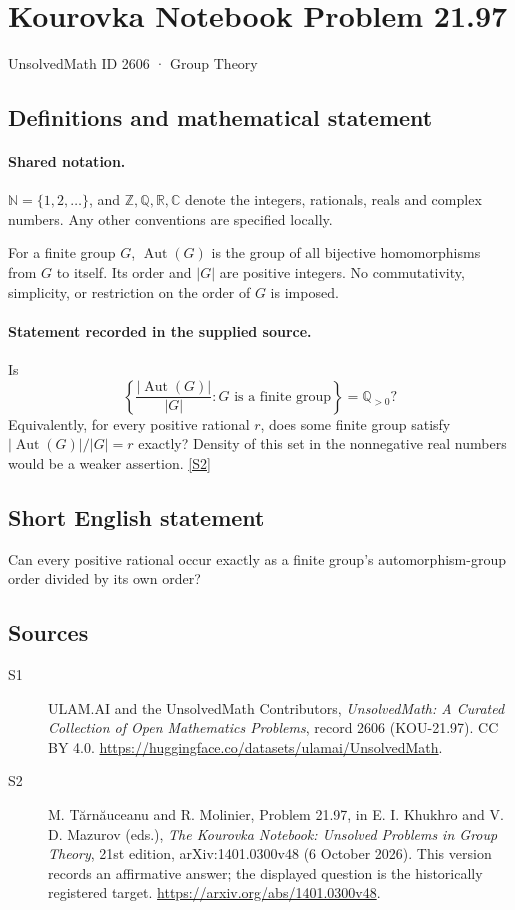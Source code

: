 \documentclass[11pt]{article}
\newcommand{\sref}[2]{\hyperlink{source:#1:#2}{[S#2]}}
\begin{document}
\setcounter{section}{2605}
\section{Kourovka Notebook Problem 21.97}\label{2606}
{\small\sffamily UnsolvedMath ID 2606 · Group Theory}
\subsection{Definitions and mathematical statement}

\paragraph{Shared notation.}$\mathbb N=\{1,2,\ldots\}$, and $\mathbb Z,\mathbb Q,\mathbb R,\mathbb C$ denote the integers, rationals, reals and complex numbers. Any other conventions are specified locally.


For a finite group $G$, $\operatorname{Aut}(G)$ is the group of all bijective homomorphisms from $G$ to itself. Its order and $|G|$ are positive integers. No commutativity, simplicity, or restriction on the order of $G$ is imposed.
\paragraph{Statement recorded in the supplied source.}
Is
\[
 \left\{\frac{|\operatorname{Aut}(G)|}{|G|}:G\text{ is a finite group}\right\}
 =\mathbb Q_{>0}?
\]
Equivalently, for every positive rational $r$, does some finite group satisfy $|\operatorname{Aut}(G)|/|G|=r$ exactly? Density of this set in the nonnegative real numbers would be a weaker assertion. \sref{2606}{2}
\subsection{Short English statement}
Can every positive rational occur exactly as a finite group’s automorphism-group order divided by its own order?
\subsection{Sources}
\begin{description}
\item[\hypertarget{source:2606:1}{S1}] ULAM.AI and the UnsolvedMath Contributors, \emph{UnsolvedMath: A Curated Collection of Open Mathematics Problems}, record 2606 (KOU-21.97). CC BY 4.0. \url{https://huggingface.co/datasets/ulamai/UnsolvedMath}.
\item[\hypertarget{source:2606:2}{S2}] M. Tărnăuceanu and R. Molinier, Problem 21.97, in E. I. Khukhro and V. D. Mazurov (eds.), \emph{The Kourovka Notebook: Unsolved Problems in Group Theory}, 21st edition, arXiv:1401.0300v48 (6 October 2026). This version records an affirmative answer; the displayed question is the historically registered target. \url{https://arxiv.org/abs/1401.0300v48}.
\end{description}
\label{end:2606}
\end{document}
